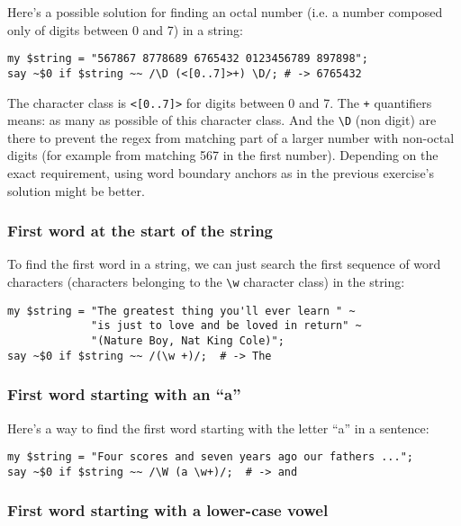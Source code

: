 Here's a possible solution for finding an octal number (i.e. 
a number composed only of digits between 0 and 7) in 
a string:

\begin{verbatim}
my $string = "567867 8778689 6765432 0123456789 897898";
say ~$0 if $string ~~ /\D (<[0..7]>+) \D/; # -> 6765432
\end{verbatim}

The character class is \verb'<[0..7]>' for digits between 
0 and 7. The \verb'+' quantifiers means: as many as possible 
of this character class. And the \verb'\D' (non digit) are 
there to prevent the regex from matching part of a larger 
number with non-octal digits (for example from matching 567 
in the first number). Depending on the exact requirement, 
using word boundary anchors as in the previous exercise's 
solution might be better.

\subsubsection{First word at the start of the string}

To find the first word in a string, we can just search the 
first sequence of word characters (characters belonging to 
the \verb'\w' character class) in the string:

\begin{verbatim}
my $string = "The greatest thing you'll ever learn " ~
             "is just to love and be loved in return" ~
             "(Nature Boy, Nat King Cole)";
say ~$0 if $string ~~ /(\w +)/;  # -> The
\end{verbatim}


\subsubsection{First word starting with an ``a''}

Here's a way to find the first word starting with the letter 
``a'' in a sentence:

\begin{verbatim}
my $string = "Four scores and seven years ago our fathers ...";
say ~$0 if $string ~~ /\W (a \w+)/;  # -> and
\end{verbatim}

\subsubsection{First word starting with a lower-case vowel}

